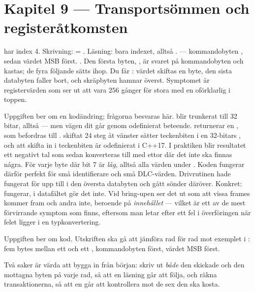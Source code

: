\section*{Kapitel 9 --- Transportsömmen och registeråtkomsten}

  har index 4. Skrivning:  = . Läsning:
bara indexet, alltså .
  --- kommandobyten , sedan värdet MSB först.
 . Den första byten, , är svaret på kommandobyten och kastas;
de fyra följande sätts ihop.
 Du får : värdet skiftas en byte, den sista databyten faller bort, och
skräpbyten hamnar överst. Symptomet är registervärden som ser ut att vara $256$ gånger för stora
med en oförklarlig  i toppen.

Uppgiften ber om en kodändring; frågorna besvaras här.
  blir  trunkerat till 32 bitar, alltså
 --- men vägen dit går genom odefinierat beteende.  returnerar
en , som befordras till .  skiftat 24 steg åt vänster
sätter teckenbiten i en 32-bitars , och att skifta in i teckenbiten är odefinierat i
C++17. I praktiken blir resultatet ett negativt tal som sedan konverteras till
 med ettor där det inte ska finnas några.
 För varje byte där bit 7 är \emph{låg}, alltså alla värden under . Koden
fungerar därför perfekt för små identifierare och små DLC-värden.
 Drivrutinen hade fungerat för  upp till  i den översta databyten och
gått sönder däröver. Konkret:  fungerar,  i datafältet gör det inte.
Vid bring-upen ser det ut som att vissa frames kommer fram och andra inte, beroende på
\emph{innehållet} --- vilket är ett av de mest förvirrande symptom som finns, eftersom man letar
efter ett fel i överföringen när felet ligger i en typkonvertering.

Uppgiften ber om kod. Utskriften ska gå att jämföra rad för rad mot exemplet i :
fem bytes mellan ett  och ett , kommandobyten först, värdet MSB först.

Två saker är värda att bygga in från början: skriv ut \emph{både} den skickade och den mottagna
byten på varje rad, så att en läsning går att följa, och räkna transaktionerna, så att en
 går att kontrollera mot de sex den ska kosta.

